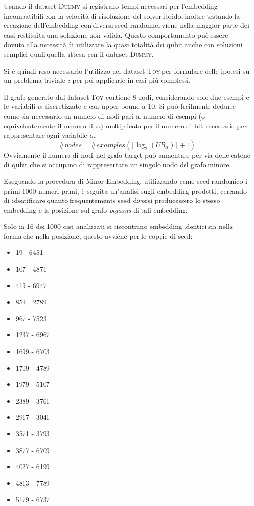\documentclass[12pt]{article}
\begin{document}
Usando il dataset \textsc{Dummy} si registrano tempi necessari per l'embedding incompatibili con la velocità di risoluzione del solver ibrido,
inoltre testando la creazione dell'embedding con diversi seed randomici viene nella maggior parte dei casi restituita una soluzione non valida.
Questo comportamento può essere dovuto alla necessità di utilizzare la quasi totalità dei qubit anche con soluzioni semplici quali quella attesa con il dataset \textsc{Dummy}.

Si è quindi reso necessario l'utilizzo del dataset \textsc{Toy} per formulare delle ipotesi su un problema triviale e per poi applicarle in casi più complessi.

Il grafo generato dal dataset \textsc{Toy} contiene 8 nodi, considerando solo due esempi e le variabili $\alpha$ discretizzate e con upper-bound a 10.
Si può facilmente dedurre come sia necessario un numero di nodi pari al numero di esempi (o equivalentemente il numero di $\alpha$) moltiplicato per il numero di bit necessario per rappresentare ogni variabile $\alpha$.
$$\#nodes = \#examples (\lfloor\log_2(UB_\alpha)\rfloor+1)$$
Ovviamente il numero di nodi nel grafo target può aumentare per via delle catene di qubit che si occupano di rappresentare un singolo nodo del grafo minore.

Eseguendo la procedura di Minor-Embedding, utilizzando come seed randomico i primi 1000 numeri primi, è seguita un'analisi sugli embedding prodotti,
cercando di identificare quanto frequentemente seed diversi producessero lo stesso embedding e la posizione sul grafo \emph{pegasus} di tali embedding.

Solo in 16 dei 1000 casi analizzati si riscontrano embedding identici sia nella forma che nella posizione, questo avviene per le coppie di seed:
\begin{multicols}{4}
  \begin{itemize}
    \item 19 - 6451
    \item 107 - 4871
    \item 419 - 6947
    \item 859 - 2789
    \item 967 - 7523
    \item 1237 - 6967
    \item 1699 - 6703
    \item 1709 - 4789
    \item 1979 - 5107
    \item 2389 - 3761
    \item 2917 - 3041
    \item 3571 - 3793
    \item 3877 - 6709
    \item 4027 - 6199
    \item 4813 - 7789
    \item 5179 - 6737
  \end{itemize}
\end{multicols}
\end{document}
